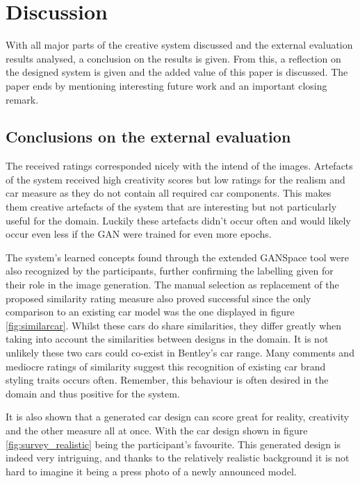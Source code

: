 \chapter{Discussion}
\label{part:conclusions}


With all major parts of the creative system discussed and the external evaluation results analysed, a conclusion on the results is given.
From this, a reflection on the designed system is given and the added value of this paper is discussed.
The paper ends by mentioning interesting future work and an important closing remark.


\section{Conclusions on the external evaluation}
\label{sec:conclusion_external_results}

The received ratings corresponded nicely with the intend of the images.
Artefacts of the system received high creativity scores but low ratings for the realism and car measure as they do not contain all required car components.
This makes them creative artefacts of the system that are interesting but not particularly useful for the domain.
Luckily these artefacts didn't occur often and would likely occur even less if the GAN were trained for even more epochs.

The system's learned concepts found through the extended GANSpace tool were also recognized by the participants, further confirming the labelling given for their role in the image generation.
The manual selection as replacement of the proposed similarity rating measure also proved successful since the only comparison to an existing car model was the one displayed in figure \ref{fig:similarcar}.
Whilst these cars do share similarities, they differ greatly when taking into account the similarities between designs in the domain.
It is not unlikely these two cars could co-exist in Bentley's car range. 
Many comments and mediocre ratings of similarity suggest this recognition of existing car brand styling traits occurs often.
Remember, this behaviour is often desired in the domain and thus positive for the system.

It is also shown that a generated car design can score great for reality, creativity and the other measure all at once.
With the car design shown in figure \ref{fig:survey_realistic} being the participant's favourite.
This generated design is indeed very intriguing, and thanks to the relatively realistic background it is not hard to imagine it being a press photo of a newly announced model.

